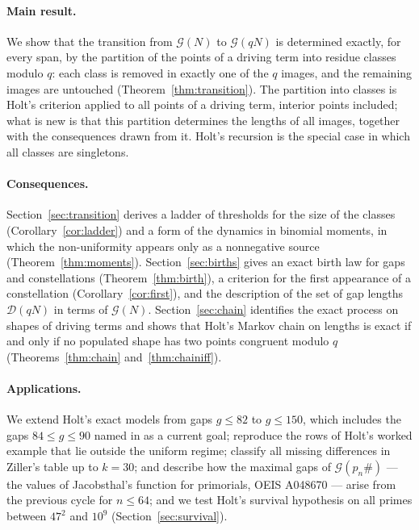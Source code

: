 \documentclass[11pt]{article}
\theoremstyle{definition}
\theoremstyle{remark}
\newcommand{\G}{\mathcal{G}}
\newcommand{\D}{\mathcal{D}}
\begin{document}
\paragraph{Main result.} We show that the transition from $\G(N)$ to $\G(qN)$ is determined exactly, for every span, by the partition of the points of a driving term into residue classes modulo $q$: each class is removed in exactly one of the $q$ images, and the remaining images are untouched (Theorem~\ref{thm:transition}). The partition into classes is Holt's criterion \cite[Lemma~3.1]{Ho25} applied to all points of a driving term, interior points included; what is new is that this partition determines the lengths of all images, together with the consequences drawn from it. Holt's recursion is the special case in which all classes are singletons.

\paragraph{Consequences.} Section~\ref{sec:transition} derives a ladder of thresholds for the size of the classes (Corollary~\ref{cor:ladder}) and a form of the dynamics in binomial moments, in which the non-uniformity appears only as a nonnegative source (Theorem~\ref{thm:moments}). Section~\ref{sec:births} gives an exact birth law for gaps and constellations (Theorem~\ref{thm:birth}), a criterion for the first appearance of a constellation (Corollary~\ref{cor:first}), and the description of the set of gap lengths $\D(qN)$ in terms of $\G(N)$. Section~\ref{sec:chain} identifies the exact process on shapes of driving terms and shows that Holt's Markov chain on lengths is exact if and only if no populated shape has two points congruent modulo $q$ (Theorems~\ref{thm:chain} and~\ref{thm:chainiff}).

\paragraph{Applications.} We extend Holt's exact models from gaps $g \le 82$ to $g \le 150$, which includes the gaps $84 \le g \le 90$ named in \cite{Ho26} as a current goal; reproduce the rows of Holt's worked example \cite[Fig.~6]{Ho26} that lie outside the uniform regime; classify all missing differences in Ziller's table \cite{Zi20} up to $k=30$; and describe how the maximal gaps of $\G(p_n\#)$ --- the values of Jacobsthal's function for primorials, OEIS A048670 --- arise from the previous cycle for $n \le 64$; and we test Holt's survival hypothesis \cite{Ho26b} on all primes between $47^2$ and $10^9$ (Section~\ref{sec:survival}).
\end{document}
